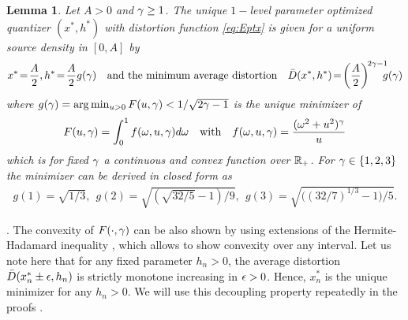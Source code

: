 \documentclass[12pt,onecolumn,journal,draftclsnofoot,letterpaper]{IEEEtran}
\newtheorem{lemma}{Lemma}
\newif\ifarxiv\arxivfalse
\newenvironment{remark}{\par\vspace{1.5ex}\noindent{\em Remark\/}.}{\par\vspace{1.5ex}}
\newcommand{\Dis}{\ensuremath{D}}                    %
\newcommand{\AvDis}{\ensuremath{\bar{\Dis}}}         %
\begin{document}
\begin{lemma}\label{lem:ggam}
  Let $A>0$ and $\gamma\geq 1$. The unique $1-$level parameter optimized quantizer $(x^*,h^*)$ with distortion
  function \eqref{eq:Eptx} is given  for a uniform source
  density in $[0,A]$ by
  \begin{align}
    x^*\!=\!\frac{A}{2},   h^*\!=\!\frac{A}{2} g(\gam) \quad\text{and the minimum average distortion} \quad
    \AvDis(x^*,h^*)\!=\!\left(\frac{A}{2}\right)^{\!2\gam-1}\!\!\!\!g(\gam)\notag
  \end{align}
  where  $g(\gamma)=\arg\min_{u>0} F(u,\gamma)<1/\sqrt{2\gamma-1}$ is the unique minimizer of 
  \begin{align}
    F(u,\gamma)=\int_0^1  f(\omega,u,\gamma) d\omega \quad\text{with}\quad f(\omega,u,\gamma)=\frac{(\omega^2+u^2)^{\gamma}}{u} 
  \end{align}
  which is for fixed $\gamma$ a continuous and convex function over ${\mathbb R}_+$. For $\gamma\in\{1,2,3\}$ the minimizer can be
  derived in closed form as 
  \begin{align}
    g(1) = \sqrt{1/3},\ \  g(2) = \sqrt{ (\sqrt{32/5}-1)/9}, 
    \ \  g(3) = \sqrt{\Big((32/7)^{1/3}-1\Big)/5}.\label{eq:ggam}
  \end{align}
\end{lemma}
%
\ifarxiv 
\begin{proof}
See \appref{app:proof_lemma_ggam}.
\end{proof}
\fi


\begin{remark}
  The convexity of $F(\cdot,\gamma)$ can be also shown by using extensions of the Hermite-Hadamard inequality \cite{ZC10},
  which allows to show convexity over any interval.
  Let us note here that for any fixed parameter $h_n>0$, the average distortion $\AvDis(x_n^*\pm \eps,h_n)$ is strictly
  monotone increasing in $\epsilon>0$. Hence, $x_n^*$ is the unique minimizer for any $h_n>0$. We will use this decoupling
  property repeatedly in the proofs \cite{GWJ18b}.
\end{remark}
\end{document}
